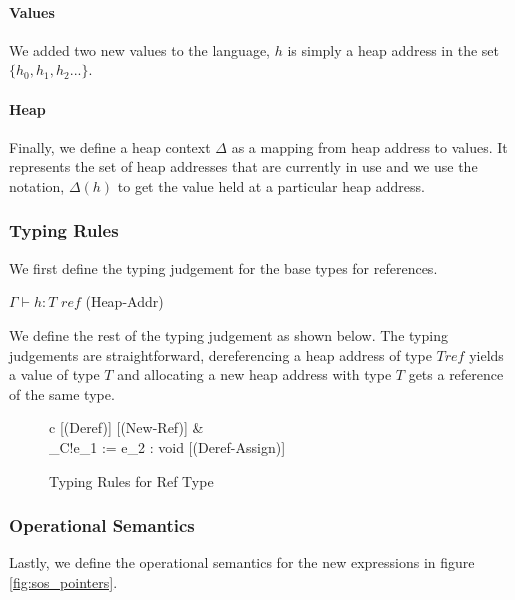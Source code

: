 \documentclass[a4paper,12pt]{report}
\begin{document}
\paragraph{Values}
We added two new values to the language, $h$ is simply a heap address in the set 
$\{h_0, h_1, h_2...\}$.

\paragraph{Heap}
Finally, we define a heap context $\Delta$ as a mapping from heap address to values.  
It represents the set of heap addresses that are currently in use and we use 
the notation, $\Delta(h)$ to get the value held at a particular heap address. 

\subsubsection{Typing Rules}
We first define the typing judgement for the base types for references. 

\begin{center}
   $\Gamma \vdash h : T\textit{ ref}$ (Heap-Addr)
\end{center}

\par
We define the rest of the typing judgement as shown below. 
The typing judgements are straightforward, 
dereferencing a heap address of type $T \textit{ref}$ yields a value of type $T$ and 
allocating a new heap address with type $T$ gets a reference of the same type.

\begin{figure}[H]
  \begin{center}
    \begin{tabular} {c}
      [(Deref)]
      \text{ }
      [(New-Ref)]
      & \\
       {\Gamma \vdash_{C}\text{ }!e_1 := e_2 : void} 
      [(Deref-Assign)]
    \end{tabular}
  \end{center}
  \caption{Typing Rules for Ref Type}
\end{figure}


\subsubsection{Operational Semantics}
Lastly, we define the operational semantics for the new expressions in figure 
\ref{fig:sos_pointers}.
\end{document}
